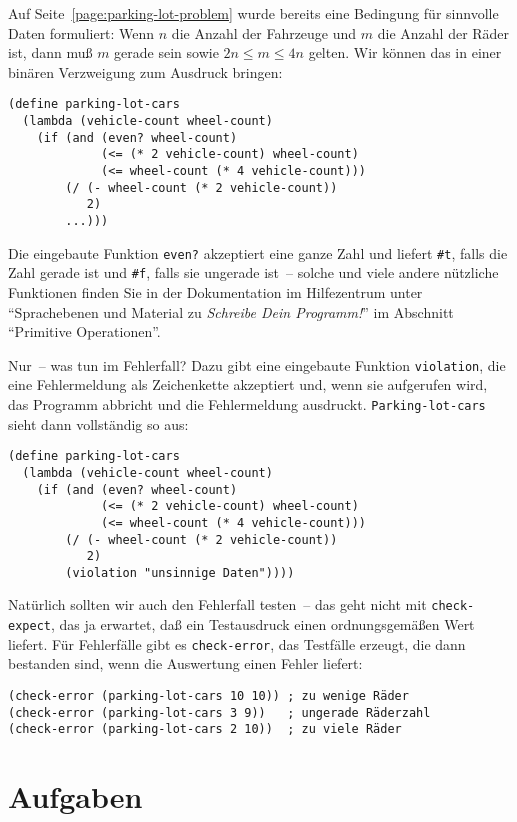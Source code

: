 Auf Seite~\ref{page:parking-lot-problem} wurde bereits eine Bedingung
für sinnvolle Daten formuliert: Wenn $n$ die Anzahl der Fahrzeuge und
$m$ die Anzahl der Räder ist, dann muß $m$ gerade sein sowie $2n\leq
m\leq 4n$ gelten.  Wir können das in einer binären Verzweigung zum
Ausdruck bringen:
%
\begin{verbatim}
(define parking-lot-cars
  (lambda (vehicle-count wheel-count)
    (if (and (even? wheel-count)
             (<= (* 2 vehicle-count) wheel-count)
             (<= wheel-count (* 4 vehicle-count)))
        (/ (- wheel-count (* 2 vehicle-count))
           2)
        ...)))
\end{verbatim}
%
Die eingebaute Funktion \texttt{even?} akzeptiert eine ganze Zahl und
liefert \verb|#t|, falls die Zahl gerade ist und \verb|#f|, falls sie
ungerade ist~-- solche und viele andere nützliche Funktionen finden
Sie in der Dokumentation im Hilfezentrum unter "`Sprachebenen und
Material zu \textit{Schreibe Dein Programm!}"' im Abschnitt
"`Primitive Operationen"'.

Nur~-- was tun im Fehlerfall?  Dazu gibt eine eingebaute Funktion
\texttt{violation}, die eine Fehlermeldung als Zeichenkette akzeptiert
und, wenn sie aufgerufen wird, das Programm abbricht und die
Fehlermeldung ausdruckt.  \texttt{Parking-lot-cars} sieht dann
vollständig so aus:
%
\begin{verbatim}
(define parking-lot-cars
  (lambda (vehicle-count wheel-count)
    (if (and (even? wheel-count)
             (<= (* 2 vehicle-count) wheel-count)
             (<= wheel-count (* 4 vehicle-count)))
        (/ (- wheel-count (* 2 vehicle-count))
           2)
        (violation "unsinnige Daten"))))
\end{verbatim}
%
Natürlich sollten wir auch den Fehlerfall testen~-- das geht nicht mit
\texttt{check-expect}, das ja erwartet, daß ein Testausdruck einen
ordnungsgemäßen Wert liefert.  Für Fehlerfälle gibt es
\texttt{check-error}, das Testfälle erzeugt, die dann bestanden sind,
wenn die Auswertung einen Fehler liefert:
%
\begin{verbatim}
(check-error (parking-lot-cars 10 10)) ; zu wenige Räder
(check-error (parking-lot-cars 3 9))   ; ungerade Räderzahl
(check-error (parking-lot-cars 2 10))  ; zu viele Räder
\end{verbatim}

\section*{Aufgaben}

